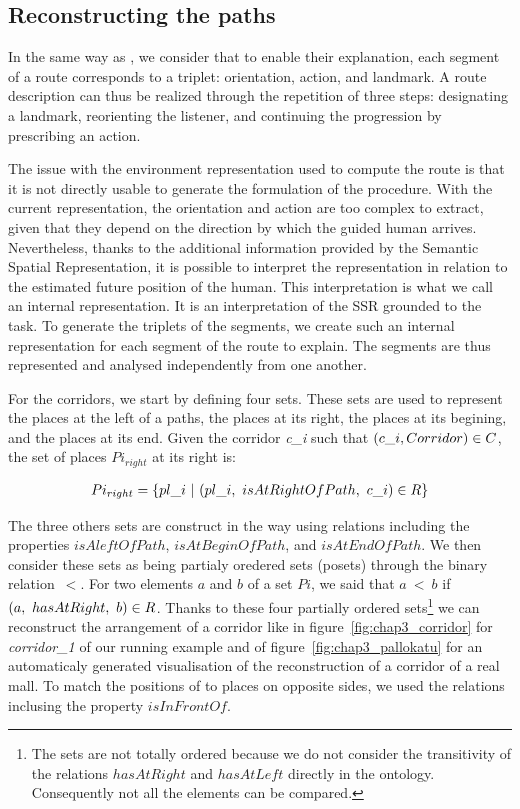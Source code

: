\subsection{Reconstructing the paths}

In the same way as \cite{tversky_1999_pictorial}, we consider that to enable their explanation, each segment of a route corresponds to a triplet: orientation, action, and landmark. A route description can thus be realized through the repetition of three steps: designating a landmark, reorienting the listener, and continuing the progression by prescribing an action.

The issue with the environment representation used to compute the route is that it is not directly usable to generate the formulation of the procedure. With the current representation, the orientation and action are too complex to extract, given that they depend on the direction by which the guided human arrives. Nevertheless, thanks to the additional information provided by the Semantic Spatial Representation, it is possible to interpret the representation in relation to the estimated future position of the human. This interpretation is what we call an internal representation. It is an interpretation of the SSR grounded to the task. To generate the triplets of the segments, we create such an internal representation for each segment of the route to explain. The segments are thus represented and analysed independently from one another.

For the corridors, we start by defining four sets. These sets are used to represent the places at the left of a paths, the places at its right, the places at its begining, and the places at its end. Given the corridor \textit{c\_i} such that $(c\_i, Corridor) \in C$, the set of places $Pi_{right}$ at its right is:

\begin{gather*}
Pi_{right} = \{ pl\_i\ |\ (pl\_i,\ isAtRightOfPath,\ c\_i) \in R \}
\end{gather*}

The three others sets are construct in the way using relations including the properties $isAleftOfPath$, $isAtBeginOfPath$, and $isAtEndOfPath$. We then consider these sets as being partialy oredered sets (posets) through the binary relation~$<$. For two elements $a$ and $b$ of a set $Pi$, we said that $a\ <\ b$ if $(a,\ hasAtRight,\ b) \in R$. Thanks to these four partially ordered sets\footnote{The sets are not totally ordered because we do not consider the transitivity of the relations $hasAtRight$ and $hasAtLeft$ directly in the ontology. Consequently not all the elements can be compared.} we can reconstruct the arrangement of a corridor like in figure~\ref{fig:chap3_corridor} for \textit{corridor\_1} of our running example and of figure~\ref{fig:chap3_pallokatu} for an automaticaly generated visualisation of the reconstruction of a corridor of a real mall. To match the positions of to places on opposite sides, we used the relations inclusing the property $isInFrontOf$.

